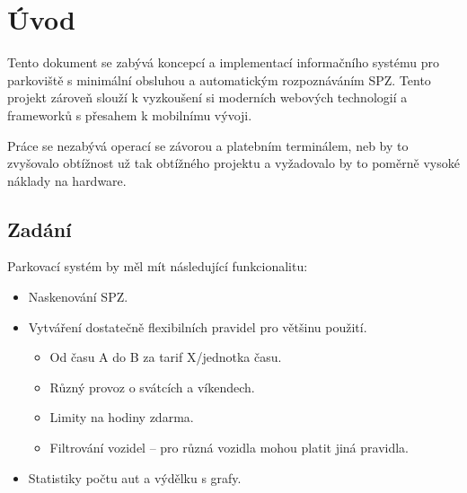 \chapter{Úvod} \label{uvod}

Tento dokument se zabývá koncepcí a implementací informačního systému pro
parkoviště s minimální obsluhou a automatickým rozpoznáváním SPZ.
Tento projekt zároveň slouží k vyzkoušení si moderních webových technologií
a frameworků s přesahem k mobilnímu vývoji.

Práce se nezabývá operací se závorou a platebním terminálem, neb by to zvyšovalo
obtížnost už tak obtížného projektu a vyžadovalo by to poměrně vysoké
náklady na hardware.

\section*{Zadání}

Parkovací systém by měl mít následující funkcionalitu:

\begin{itemize}
  \setlength\itemsep{0.05em}
  \item Naskenování SPZ.
  \item Vytváření dostatečně flexibilních pravidel pro většinu použití.
  \begin{itemize}
    \setlength\itemsep{0.05em}
      \item Od času A do B za tarif X/jednotka času.
      \item Různý provoz o svátcích a víkendech. \label{missing1}
      \item Limity na hodiny zdarma.
      \item Filtrování vozidel -- pro různá vozidla mohou platit jiná pravidla.
    \end{itemize}
  \item Statistiky počtu aut a výdělku s grafy.
\end{itemize}
